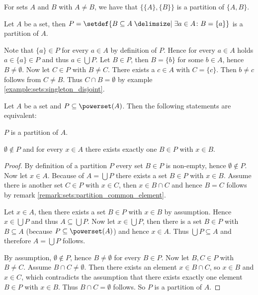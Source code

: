 \begin{examples}
    \begin{exampleenumerate}
        \item For sets $A$ and $B$ with $A\neq B$, we have that $\{\{A\},\{B\}\}$ is a partition of $\{A,B\}$.
        \item Let $A$ be a set, then $P=\setdef{B\subseteq A\given \exists a\in A\colon B=\{a\}}$ is a partition of $A$.
        \begin{miniproof}
            Note that $\{a\}\in P$ for every $a\in A$ by definition of $P$. Hence for every $a\in A$ holds $a\in\{a\}\in P$ and thus $a\in\bigcup P$. Let $B\in P$, then $B=\{b\}$ for some $b\in A$, hence $B\neq\emptyset$. Now let $C\in P$ with $B\neq C$. There exists a $c\in A$ with $C=\{c\}$. Then $b\neq c$ follows from $C\neq B$. Thus $C\cap B=\emptyset$ by example \ref{example:sets:singleton_disjoint}.
        \end{miniproof}
    \end{exampleenumerate}
\end{examples}

\begin{theorem}\label{theorem:sets:partition_equivalence}
    Let $A$ be a set and $P\subseteq\powerset(A)$. Then the following statements are equivalent:
    \begin{intheoremenumerate}
        \item $P$ is a partition of $A$.
        \item $\emptyset\notin P$ and for every $x\in A$ there exists exactly one $B\in P$ with $x\in B$.
    \end{intheoremenumerate}
\end{theorem}

\begin{proof}
     By definition of a partition $P$ every set $B\in P$ is non-empty, hence $\emptyset\notin P$. Now let $x\in A$. Because of $A=\bigcup P$ there exists a set $B\in P$ with $x\in B$. Assume there is another set $C\in P$ with $x\in C$, then $x\in B\cap C$ and hence $B=C$ follows by remark \ref{remark:sets:partition_common_element}.

     Let $x\in A$, then there exists a set $B\in P$ with $x\in B$ by assumption. Hence $x\in\bigcup P$ and thus $A\subseteq\bigcup P$. Now let $x\in\bigcup P$, then there is a set $B\in P$ with $B\subseteq A$ (because $P\subseteq\powerset(A)$) and hence $x\in A$. Thus $\bigcup P\subseteq A$ and therefore $A=\bigcup P$ follows.

    By assumption, $\emptyset\notin P$, hence $B\neq\emptyset$ for every $B\in P$. Now let $B,C\in P$ with $B\neq C$. Assume $B\cap C\neq\emptyset$. Then there exists an element $x\in B\cap C$, so $x\in B$ and $x\in C$, which contradicts the assumption that there exists exactly one element $B\in P$ with $x\in B$. Thus $B\cap C=\emptyset$ follows. So $P$ is a partition of $A$.
\end{proof}

